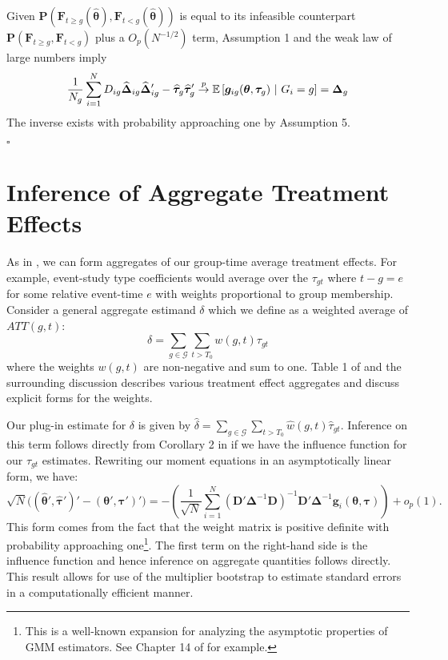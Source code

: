 \documentclass[12pt]{article}
\begin{document}
Given $\bm P(\bm F_{t \geq g}(\widehat{\bm \theta}), \bm F_{t < g}(\widehat{\bm \theta}))$ is equal to its infeasible counterpart $\bm P(\bm F_{t \geq g}, \bm F_{t < g})$ plus a $O_p(N^{-1/2})$ term, Assumption 1 and the weak law of large numbers imply 
\begin{equation*}
    \frac{1}{N_g} \sum_{i = 1}^N D_{ig} \widehat{\bm \Delta}_{ig} \widehat{\bm \Delta}_{ig}' - \widehat{\bm \tau}_g \widehat{\bm \tau}_g' \stackrel{p}{\rightarrow} \mathbb{E}\left[\bm g_{ig}(\bm \theta, \bm \tau_g) \ \vert \ G_i = g\right] = \bm \Delta_g
\end{equation*}
The inverse exists with probability approaching one by Assumption 5.

$\square$


\section{Inference of Aggregate Treatment Effects}

As in \citet{Callaway_Santanna_2021}, we can form aggregates of our group-time average treatment effects. For example, event-study type coefficients would average over the $\tau_{gt}$ where $t - g = e$ for some relative event-time $e$ with weights proportional to group membership. Consider a general aggregate estimand $\delta$ which we define as a weighted average of $ATT(g,t)$:
\begin{equation}
\delta = \sum_{g\in \mathcal{G}} \sum_{t > T_0} w(g,t) \tau_{gt}
\end{equation}
where the weights $w(g,t)$ are non-negative and sum to one. Table 1 of \citet{Callaway_Santanna_2021} and the surrounding discussion describes various treatment effect aggregates and discuss explicit forms for the weights. 

Our plug-in estimate for $\delta$ is given by $\hat{\delta} = \sum_{g\in \mathcal{G}} \sum_{t > T_0} \hat{w}(g,t) \hat{\tau}_{gt}$. Inference on this term follows directly from Corollary 2 in \citet{Callaway_Santanna_2021} if we have the influence function for our $\tau_{gt}$ estimates. Rewriting our moment equations in an asymptotically linear form, we have:
\begin{equation}
    \sqrt{N}\Big( (\widehat{\bm \theta}', \widehat{\bm \tau}')' - (\bm \theta', \bm \tau')' \Big) = - \left( \frac{1}{\sqrt{N}} \sum_{i = 1}^N (\bm D' \bm \Delta^{-1} \bm D)^{-1} \bm D' \bm \Delta^{-1} \bm g_i(\bm \theta, \bm \tau) \right) + o_p(1).
\end{equation}
This form comes from the fact that the weight matrix is positive definite with probability approaching one\footnote{This is a well-known expansion for analyzing the asymptotic properties of GMM estimators. See Chapter 14 of \citet{Wooldridge_2010} for example.}. The first term on the right-hand side is the influence function and hence inference on aggregate quantities follows directly. This result allows for use of the multiplier bootstrap to estimate standard errors in a computationally efficient manner.
\end{document}
